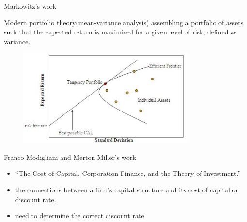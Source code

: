 \documentclass{beamer}
\begin{document}
\begin{frame}{Markowitz's work}
	\begin{block}{Modern portfolio theory(mean-variance analysis)}
		assembling a portfolio of assets such that \alert{the expected return is maximized }for a given level of risk, defined as variance.
		\begin{figure}
			\includegraphics[width=0.8\textwidth]{Markowitz_frontier.jpg}
		\end{figure}
	\end{block}
\end{frame}
\begin{frame}{Franco Modigliani and Merton Miller’s work}
	\begin{itemize}
		\item<2-> “The Cost of Capital, Corporation Finance, and the Theory of Investment.”
		\item<3->the connections between a firm’s capital structure and its cost of capital or discount rate.
		\item<4->\alert{need to} determine the correct discount rate
	\end{itemize}
\end{frame}
\end{document}
